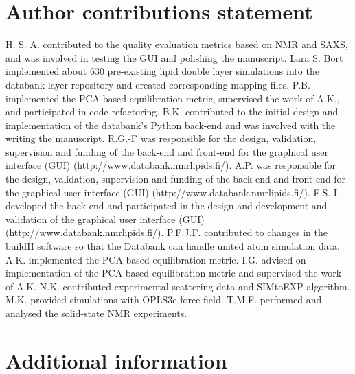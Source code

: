 \documentclass[fleqn,10pt]{wlscirep}
\begin{document}
\section*{Author contributions statement}

H. S. A. contributed to the quality evaluation metrics based on NMR and SAXS, and was involved in testing the GUI and polishing the manuscript.
Lara S. Bort implemented about 630 pre-existing lipid double layer simulations into the databank layer repository and created corresponding mapping files.
P.B. implemented the PCA-based equilibration metric, supervised the work of A.K., and participated in code refactoring.
B.K. contributed to the initial design and implementation of the databank's Python back-end and was involved with the writing the manuscript.
R.G.-F was responsible for the design, validation, supervision and funding of the back-end and front-end for the graphical user interface (GUI) (http://www.databank.nmrlipids.fi/).
A.P. was responsible for the design, validation, supervision and funding of the back-end and front-end for the graphical user interface (GUI) (http://www.databank.nmrlipids.fi/).
F.S.-L. developed the back-end and participated in the design and development and validation of the graphical user interface (GUI) (http://www.databank.nmrlipids.fi/).
P.F.J.F. contributed to changes in the buildH software so that the Databank can handle united atom simulation data.
A.K. implemented the PCA-based equilibration metric. 
I.G. advised on implementation of the PCA-based equilibration metric and supervised the work of A.K.
N.K. contributed experimental scattering data and SIMtoEXP algorithm.
M.K. provided simulations with OPLS3e force field. 
T.M.F. performed and analysed the solid-state NMR experiments.

\section*{Additional information}


\end{document}
